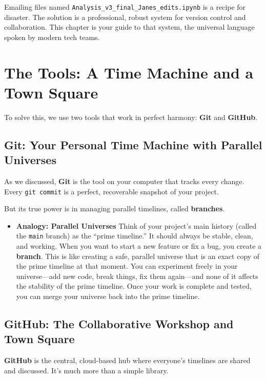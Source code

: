 \documentclass[
  letterpaper,
  DIV=11,
  numbers=noendperiod]{scrreprt}
\providecommand{\tightlist}{%
  \setlength{\itemsep}{0pt}\setlength{\parskip}{0pt}}
\begin{document}
Emailing files named \texttt{Analysis\_v3\_final\_Janes\_edits.ipynb} is
a recipe for disaster. The solution is a professional, robust system for
version control and collaboration. This chapter is your guide to that
system, the universal language spoken by modern tech teams.

\section{The Tools: A Time Machine and a Town
Square}\label{the-tools-a-time-machine-and-a-town-square}

To solve this, we use two tools that work in perfect harmony:
\textbf{Git} and \textbf{GitHub}.

\subsection{Git: Your Personal Time Machine with Parallel
Universes}\label{git-your-personal-time-machine-with-parallel-universes}

As we discussed, \textbf{Git} is the tool on your computer that tracks
every change. Every \texttt{git\ commit} is a perfect, recoverable
snapshot of your project.

But its true power is in managing parallel timelines, called
\textbf{branches}.

\begin{itemize}
\tightlist
\item
  \textbf{Analogy: Parallel Universes} Think of your project's main
  history (called the \texttt{main} branch) as the ``prime timeline.''
  It should always be stable, clean, and working. When you want to start
  a new feature or fix a bug, you create a \textbf{branch}. This is like
  creating a safe, parallel universe that is an exact copy of the prime
  timeline at that moment. You can experiment freely in your
  universe---add new code, break things, fix them again---and none of it
  affects the stability of the prime timeline. Once your work is
  complete and tested, you can merge your universe back into the prime
  timeline.
\end{itemize}

\subsection{GitHub: The Collaborative Workshop and Town
Square}\label{github-the-collaborative-workshop-and-town-square}

\textbf{GitHub} is the central, cloud-based hub where everyone's
timelines are shared and discussed. It's much more than a simple
library.
\end{document}
